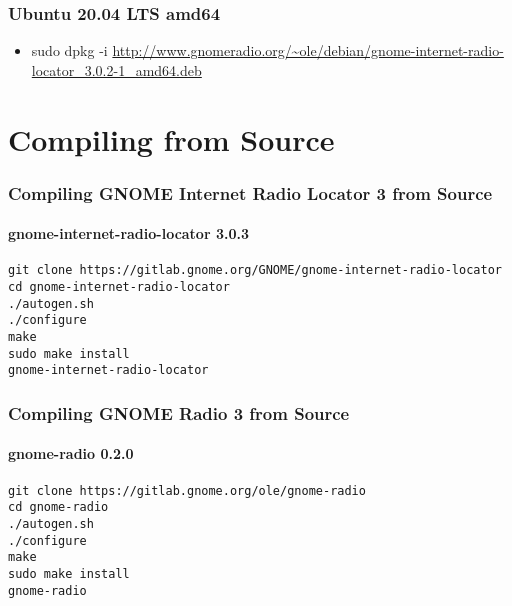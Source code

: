 \documentclass[aspectratio=43]{beamer}
\begin{document}
\begin{frame}
\frametitle{Ubuntu 20.04 LTS amd64}

    \begin{itemize}
        \item sudo dpkg -i \url{http://www.gnomeradio.org/~ole/debian/gnome-internet-radio-locator\_3.0.2-1\_amd64.deb}
    \end{itemize}

\end{frame}

\section{Compiling from Source}

\begin{frame}
\frametitle{Compiling GNOME Internet Radio Locator 3 from Source}
\framesubtitle{gnome-internet-radio-locator 3.0.3}

    \texttt{git clone https://gitlab.gnome.org/GNOME/gnome-internet-radio-locator\\
cd gnome-internet-radio-locator\\
./autogen.sh\\
./configure\\
make\\
sudo make install\\
gnome-internet-radio-locator}

\end{frame}

\begin{frame}
\frametitle{Compiling GNOME Radio 3 from Source}
\framesubtitle{gnome-radio 0.2.0}

    \texttt{git clone https://gitlab.gnome.org/ole/gnome-radio\\
cd gnome-radio\\
./autogen.sh\\
./configure\\
make\\
sudo make install\\
gnome-radio}

\end{frame}
\end{document}
